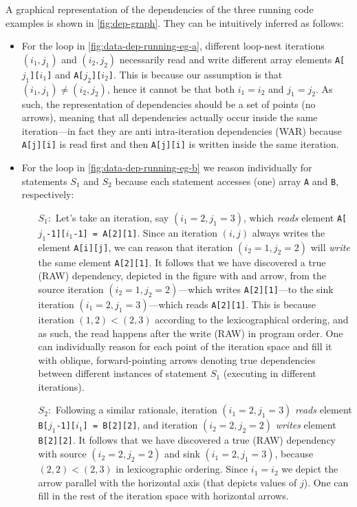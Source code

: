 A graphical representation of the dependencies of the three running code
examples is shown in \cref{fig:dep-graph}.   They can be intuitively inferred
as follows:
\begin{itemize}
\item For the loop in \cref{fig:data-dep-running-eg-a}, different
  loop-nest iterations $(i_1,j_1)$ and $(i_2,j_2)$ necessarily read
  and write different array elements \texttt{A[$j_1$][$i_1$]} and
  \texttt{A[$j_2$][$i_2$]}.  This is because our assumption is that
  $(i_1,j_1) \neq (i_2,j_2)$, hence it cannot be that both $i_1 = i_2$
  and $j_1 = j_2$. As such, the representation of dependencies should
  be a set of points (no arrows), meaning that all dependencies
  actually occur inside the same iteration---in fact they are anti
  intra-iteration dependencies (WAR) because \texttt{A[j][i]} is read
  first and then \texttt{A[j][i]} is written inside the same
  iteration.
\item For the loop in \cref{fig:data-dep-running-eg-b} we reason
  individually for statements $S_1$ and $S_2$ because each statement
  accesses (one) array \texttt{A} and \texttt{B}, respectively:
  \begin{itemize}
  \item[$S_1:$] Let's take an iteration, say $(i_1=2, j_1=3)$,
    which \emph{reads} element \texttt{A[$j_1$-1][$i_1$-1] = A[2][1]}.
    Since an iteration $(i,j)$ always writes the element
    \texttt{A[i][j]}, we can reason that iteration $(i_2=1, j_2=2)$
    will \emph{write} the same element \texttt{A[2][1]}.
    It follows that we have discovered a true (RAW) dependency,
    depicted in the figure with and arrow, from the source
    iteration $(i_2=1, j_2=2)$---which writes \texttt{A[2][1]}---to
    the sink iteration $(i_1=2, j_1=3)$---which reads \texttt{A[2][1]}.
    This is because iteration $(1,2) < (2,3)$ according to the
    lexicographical ordering, and as such, the read happens after
    the write (RAW) in program order. One can individually reason
    for each point of the iteration space and fill it with oblique,
    forward-pointing arrows denoting true dependencies between
    different instances of statement $S_1$
    (executing in different iterations).
  \item[$S_2:$] Following a similar rationale, iteration $(i_1=2, j_1=3)$
    \emph{reads} element \texttt{B[$j_1$-1][$i_1$] = B[2][2]}, and
    iteration $(i_2=2, j_2=2)$ \emph{writes} element \texttt{B[2][2]}.
    It follows that we have discovered a true (RAW) dependency
    with source $(i_2=2, j_2=2)$ and sink $(i_1=2, j_1=3)$,
    because $(2,2) < (2,3)$ in lexicographic ordering.
    Since $i_1=i_2$ we depict the arrow parallel with the
    horizontal axis (that depicts values of $j$). One can
    fill in the rest of the iteration space with horizontal arrows.
  \end{itemize}


\end{itemize}

